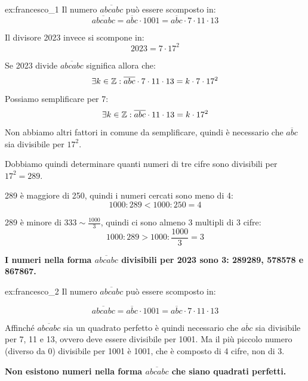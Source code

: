 \begin{soluzione}{ex:francesco_1}
    Il numero $\overline{abcabc}$ può essere scomposto in:
    \begin{equation*}
        \overline{abcabc} = \overline{abc} \cdot 1001 = \overline{abc} \cdot 7 \cdot 11 \cdot 13
    \end{equation*}

    Il divisore 2023 invece si scompone in:
    \begin{equation*}
        2023 = 7 \cdot 17^2
    \end{equation*}

    Se 2023 divide $\overline{abcabc}$ significa allora che:
    \begin{equation*}
        \exists k \in  \mathbb{Z} : \overline{abc} \cdot 7 \cdot 11 \cdot 13 = k \cdot 7 \cdot 17^2
    \end{equation*}

    Possiamo semplificare per 7:
    \begin{equation*}
        \exists k \in  \mathbb{Z} : \overline{abc} \cdot 11 \cdot 13 = k \cdot 17^2
    \end{equation*}

    Non abbiamo altri fattori in comune da semplificare, quindi è necessario che $\overline{abc}$ sia divisibile per
    $17^2$.

    Dobbiamo quindi determinare quanti numeri di tre cifre sono divisibili per $17^2 = 289$.

    289 è maggiore di 250, quindi i numeri cercati sono meno di 4:
    \begin{equation*}
        1000 : 289 < 1000 : 250 = 4
    \end{equation*}

    289 è minore di $333 \sim \frac{1000}{3}$, quindi ci sono almeno 3 multipli di 3 cifre:
    \begin{equation*}
        1000 : 289 > 1000 : \frac{1000}{3} = 3
    \end{equation*}

    \bigskip
    \textbf{I numeri nella forma $\overline{abcabc}$ divisibili per 2023 sono 3: 289289, 578578 e 867867.}
\end{soluzione}

\begin{soluzione}{ex:francesco_2}
    Il numero $\overline{abcabc}$ può essere scomposto in:

    \begin{equation*}
        \overline{abcabc} = \overline{abc} \cdot 1001 = \overline{abc} \cdot 7 \cdot 11 \cdot 13
    \end{equation*}

    Affinché $\overline{abcabc}$ sia un quadrato perfetto è quindi necessario che $\overline{abc}$ sia divisibile per
    7, 11 e 13, ovvero deve essere divisibile per 1001.
    Ma il più piccolo numero (diverso da 0) divisibile per 1001 è 1001, che è composto di 4 cifre, non di 3.

    \bigskip
    \textbf{Non esistono numeri nella forma $\overline{abcabc}$ che siano quadrati perfetti.}
\end{soluzione}
